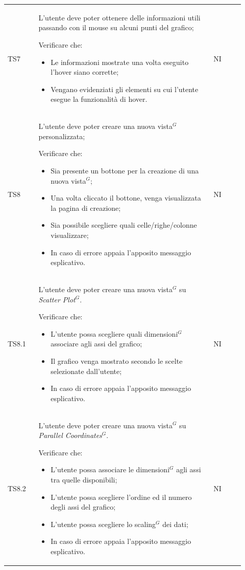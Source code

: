 \begin{longtable}{p{0.12\linewidth}p{0.68\linewidth}p{0.12\linewidth}}
    \rowcolor[RGB]{233, 245, 206}
    TS7 &
    L'utente deve poter ottenere delle informazioni utili passando con il mouse su alcuni punti del grafico;\par
    Verificare che:
    \begin{itemize}
        \item Le informazioni mostrate una volta eseguito l'hover siano corrette;
        \item Vengano evidenziati gli elementi su cui l'utente esegue la funzionalità di hover.
    \end{itemize}&
    NI \\

    \rowcolor[RGB]{216, 235, 171}
    TS8 &
    L'utente deve poter creare una nuova vista$^{G}$ personalizzata; \par
    Verificare che:
    \begin{itemize}
        \item Sia presente un bottone per la creazione di una nuova vista$^{G}$;
        \item Una volta cliccato il bottone, venga visualizzata la pagina di creazione;
        \item Sia possibile scegliere quali celle/righe/colonne visualizzare;
        \item In caso di errore appaia l’apposito messaggio esplicativo.
    \end{itemize}&
    NI \\

    \rowcolor[RGB]{233, 245, 206}
    TS8.1 &
    L'utente deve poter creare una nuova vista$^{G}$ su \textit{Scatter Plot}$^{G}$. \par
    Verificare che:
    \begin{itemize}
        \item L'utente possa scegliere quali dimensioni$^{G}$ associare agli assi del grafico;
        \item Il grafico venga mostrato secondo le scelte selezionate dall'utente;
        \item In caso di errore appaia l’apposito messaggio esplicativo.
    \end{itemize}&
    NI \\

    \rowcolor[RGB]{216, 235, 171}
    TS8.2 & 
    L'utente deve poter creare una nuova vista$^{G}$ su \textit{Parallel Coordinates}$^{G}$. \par
    Verificare che:
    \begin{itemize}
        \item L'utente possa associare le dimensioni$^{G}$ agli assi tra quelle disponibili;
        \item L'utente possa scegliere l'ordine ed il numero degli assi del grafico;
        \item L'utente possa scegliere lo scaling$^{G}$ dei dati;
        \item In caso di errore appaia l’apposito messaggio esplicativo.
    \end{itemize}&
    NI \\


\end{longtable}
